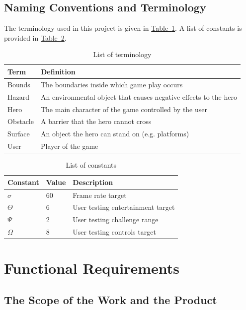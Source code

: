 \documentclass[12pt, titlepage]{article}
\begin{document}
\subsection{Naming Conventions and Terminology}
The terminology used in this project is given in \hyperref[tab:terminology]{Table~\ref*{tab:terminology}}.  A list of constants is provided in \hyperref[tab:constants]{Table~\ref*{tab:constants}}.
\begin{table}[h]
\caption{List of terminology} \label{tab:terminology}
\begin{tabularx}{\textwidth}{p{3cm}X}
\toprule {\bf Term} & {\bf Definition}\\
\midrule
Bounds & The boundaries inside which game play occurs\\
Hazard & An environmental object that causes negative effects to the hero\\
Hero & The main character of the game controlled by the user\\
Obstacle & A barrier that the hero cannot cross\\
Surface & An object the hero can stand on (e.g. platforms)\\
User & Player of the game\\
\bottomrule
\end{tabularx}
\end{table}

\begin{table}[ht]
\caption{List of constants} \label{tab:constants}
\begin{tabularx}{\textwidth}{p{3cm}p{2cm}X}
\toprule {\bf Constant} & {\bf Value} & {\bf Description}\\
\midrule
$\sigma$ & 60 & Frame rate target\\
$\Theta$ & 6 & User testing entertainment target\\
$\Psi$ & 2 & User testing challenge range\\
$\Omega$ & 8 & User testing controls target\\
\bottomrule
\end{tabularx}
\end{table}

\FloatBarrier

\newpage
\section{Functional Requirements}
\subsection{The Scope of the Work and the Product}
\end{document}
